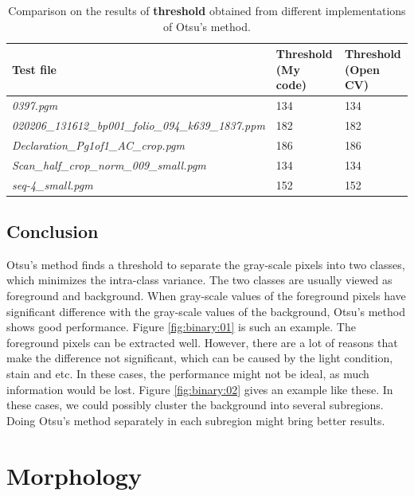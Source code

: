 \documentclass[paper=a4, fontsize=11pt]{scrartcl}
\numberwithin{equation}{section}		%
\numberwithin{figure}{section}			%
\numberwithin{table}{section}				%
\begin{document}
\begin{table}[h]
\label{tab:binary_comp}
\caption {Comparison on the results of \textbf{threshold} obtained from different implementations of Otsu's method.}
\begin{center}
\begin{tabular}{ | l | l | l | }
\hline
Test file & Threshold (My code) & Threshold (Open CV)  \\ \hline
\emph{0397.pgm}                                          & 134 & 134 \\ \hline
\emph{020206\_131612\_bp001\_folio\_094\_k639\_1837.ppm} & 182 & 182 \\ \hline
\emph{Declaration\_Pg1of1\_AC\_crop.pgm}                 & 186 & 186 \\ \hline
\emph{Scan\_half\_crop\_norm\_009\_small.pgm}            & 134 & 134 \\ \hline
\emph{seq-4\_small.pgm}                                  & 152 & 152 \\ \hline
\end{tabular}
\end{center}
\end{table}

\subsection{Conclusion}

Otsu's method finds a threshold to separate the gray-scale pixels into two classes, which minimizes the intra-class variance.
The two classes are usually viewed as foreground and background.
When gray-scale values of the foreground pixels have significant difference with the gray-scale values of the background, Otsu's method shows good performance.
Figure \ref{fig:binary:01} is such an example.
The foreground pixels can be extracted well.
However, there are a lot of reasons that make the difference not significant, which can be caused by the light condition, stain and etc.
In these cases, the performance might not be ideal, as much information would be lost.
Figure \ref{fig:binary:02} gives an example like these.
In these cases, we could possibly cluster the background into several subregions.
Doing Otsu's method separately in each subregion might bring better results.

\section{Morphology}
\end{document}
